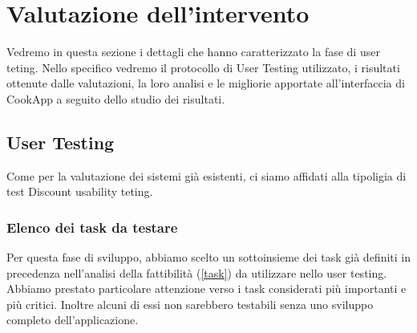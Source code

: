 \section{Valutazione dell'intervento}
Vedremo in questa sezione i dettagli che hanno caratterizzato la fase di user teting. 
Nello specifico vedremo il protocollo di User Testing utilizzato, i
risultati ottenute dalle valutazioni, la loro analisi e le migliorie
apportate all'interfaccia di CookApp a seguito dello studio dei
risultati.


\subsection{User Testing}

Come per la valutazione dei sistemi già esistenti, ci siamo affidati
alla tipoligia di test Discount usability teting.

\subsubsection*{Elenco dei task da testare}
Per questa fase di sviluppo, abbiamo scelto un sottoinsieme dei task già definiti in precedenza
nell'analisi della fattibilità (\ref{task}) da utilizzare nello user
testing. Abbiamo prestato particolare attenzione verso i task
considerati più importanti e più critici. Inoltre alcuni di essi non
sarebbero testabili senza uno sviluppo completo dell'applicazione.

